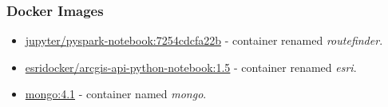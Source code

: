 \documentclass[11 pt]{IEEEtran}
\theoremstyle{definition}
\theoremstyle{definition}
\begin{document}
\subsubsection{Docker Images}\label{docker-images}
\begin{itemize}
  \item \href{https://hub.docker.com/r/jupyter/pyspark-notebook}{jupyter/pyspark-notebook:7254cdcfa22b}\cite{img-pyspark} - container renamed \emph{routefinder}.
  \item \href{https://hub.docker.com/r/esridocker/arcgis-api-python-notebook}{esridocker/arcgis-api-python-notebook:1.5}\cite{img-esri} - container renamed \emph{esri}.
  \item \href{https://hub.docker.com/_/mongo}{mongo:4.1}\cite{img-mongo} - container named \emph{mongo}.
\end{itemize}
\end{document}
